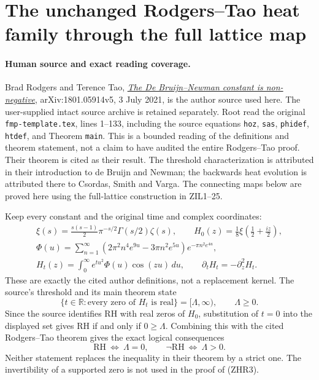 \section{The unchanged Rodgers--Tao heat family through the full lattice map}
\label{sec:zero-inversion-zeta-heat}

\paragraph{Human source and exact reading coverage.}
Brad Rodgers and Terence Tao,
\href{https://arxiv.org/abs/1801.05914v5}{\emph{The De Bruijn--Newman
constant is non-negative}}, arXiv:1801.05914v5, 3 July 2021,
is the author source used here. The user-supplied intact source archive
is retained separately. Root read the original
\nolinkurl{fmp-template.tex}, lines 1--133, including the source equations
\texttt{hoz}, \texttt{sas}, \texttt{phidef}, \texttt{htdef}, and
Theorem \texttt{main}. This is a bounded reading of the definitions
and theorem statement, not a claim to have audited the entire
Rodgers--Tao proof. Their theorem is cited as their result.
The threshold characterization is attributed in their introduction
to de Bruijn and Newman; the backwards heat evolution is attributed
there to Csordas, Smith and Varga. The connecting maps below are
proved here using the full-lattice construction in ZIL1--25.

Keep every constant and the original time and complex coordinates:
\begin{equation}\tag{ZHR1}
\begin{gathered}
 \xi(s)=\frac{s(s-1)}2\pi^{-s/2}\Gamma(s/2)\zeta(s),
 \qquad H_0(z)=\frac18\xi\left(\frac12+\frac{iz}{2}\right),\\
 \Phi(u)=\sum_{n=1}^{\infty}
 (2\pi^2n^4e^{9u}-3\pi n^2e^{5u})e^{-\pi n^2e^{4u}},\\
 H_t(z)=\int_0^\infty e^{tu^2}\Phi(u)\cos(zu)\,du,
 \qquad \partial_tH_t=-\partial_z^2H_t .
\end{gathered}
\end{equation}
These are exactly the cited author definitions, not a replacement
kernel. The source's threshold and its main theorem state
\begin{equation}\tag{ZHR2}
 \{t\in\mathbb R: \text{every zero of }H_t\text{ is real}\}
    =[\Lambda,\infty),\qquad \Lambda\ge0.
\end{equation}
Since the source identifies RH with real zeros of $H_0$, substitution
of $t=0$ into the displayed set gives RH if and only if $0\ge\Lambda$.
Combining this with the cited Rodgers--Tao theorem gives the exact
logical consequences
\begin{equation}\tag{ZHR3}
 \mathrm{RH}\ \Longleftrightarrow\ \Lambda=0,
 \qquad
 \neg\mathrm{RH}\ \Longleftrightarrow\ \Lambda>0.
\end{equation}
Neither statement replaces the inequality in their theorem by a
strict one. The invertibility of a supported zero is not used in
the proof of (ZHR3).

